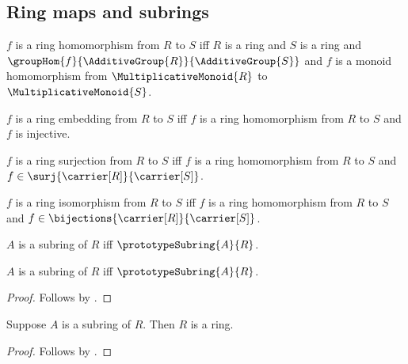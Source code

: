 \subsection{Ring maps and subrings}

\begin{definition}\label{spike_phrase_ring_hom}
    $f$ is a ring homomorphism from $R$ to $S$ iff
        $R$ is a ring and $S$ is a ring and
        $\groupHom{f}{\AdditiveGroup{R}}{\AdditiveGroup{S}}$ and
        $f$ is a monoid homomorphism from
            $\MultiplicativeMonoid{R}$ to $\MultiplicativeMonoid{S}$.
\end{definition}

\begin{definition}\label{spike_phrase_ring_embedding}
    $f$ is a ring embedding from $R$ to $S$ iff
        $f$ is a ring homomorphism from $R$ to $S$ and
        $f$ is injective.
\end{definition}

\begin{definition}\label{spike_phrase_ring_surjection}
    $f$ is a ring surjection from $R$ to $S$ iff
        $f$ is a ring homomorphism from $R$ to $S$ and
        $f\in\surj{\carrier[R]}{\carrier[S]}$.
\end{definition}

\begin{definition}\label{spike_phrase_ring_isomorphism}
    $f$ is a ring isomorphism from $R$ to $S$ iff
        $f$ is a ring homomorphism from $R$ to $S$ and
        $f\in\bijections{\carrier[R]}{\carrier[S]}$.
\end{definition}

\begin{definition}\label{spike_phrase_subring}
    $A$ is a subring of $R$ iff $\prototypeSubring{A}{R}$.
\end{definition}

\begin{theorem}\label{spike_phrase_subring_equivalence}
    $A$ is a subring of $R$ iff $\prototypeSubring{A}{R}$.
\end{theorem}
\begin{proof}
    Follows by .
\end{proof}

\begin{proposition}\label{spike_phrase_subring_guard}
    Suppose $A$ is a subring of $R$.
    Then $R$ is a ring.
\end{proposition}
\begin{proof}
    Follows by
        .
\end{proof}


